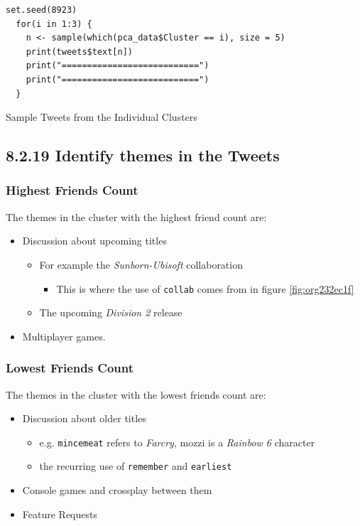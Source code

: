 \documentclass[11pt]{article}
\begin{document}
\begin{listing}[htbp]
\begin{verbatim}
set.seed(8923)
  for(i in 1:3) {
    n <- sample(which(pca_data$Cluster == i), size = 5)
    print(tweets$text[n])
    print("===========================")
    print("===========================")
  }
\end{verbatim}
\caption{\label{orgf2091a1}Sample Tweets from the Individual Clusters}
\end{listing}

\subsection{8.2.19 Identify themes in the Tweets}
\label{sec:org933b3fd}
\subsubsection{Highest Friends Count}
\label{sec:org9f53b51}
The themes in the cluster with the highest friend count are:

\begin{itemize}
\item Discussion about upcoming titles
\begin{itemize}
\item For example the \emph{Sunborn-Ubisoft} collaboration
\begin{itemize}
\item This is where the use of \texttt{collab} comes from in figure \ref{fig:org232ec1f}
\end{itemize}
\item The upcoming \emph{Division 2} release
\end{itemize}
\item Multiplayer games.
\end{itemize}
\subsubsection{Lowest Friends Count}
\label{sec:org70bff06}

The themes in the cluster with the lowest friends count are:

\begin{itemize}
\item Discussion about older titles
\begin{itemize}
\item e.g. \texttt{mincemeat} refers to \emph{Farcry}, mozzi is a \emph{Rainbow 6} character
\item the recurring use of \texttt{remember} and \texttt{earliest}
\end{itemize}
\item Console games and crossplay between them
\item Feature Requests
\end{itemize}
\end{document}
